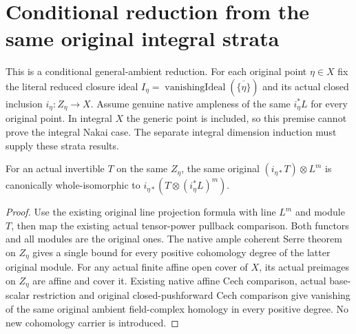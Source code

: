 \section{Conditional reduction from the same original integral strata}
This is a conditional general-ambient reduction. For each original point
$\eta\in X$ fix the literal reduced closure ideal
$I_\eta=\operatorname{vanishingIdeal}(\overline{\{\eta\}})$ and its actual
closed inclusion $i_\eta:Z_\eta\to X$. Assume genuine native ampleness of
the same $i_\eta^*L$ for every original point. In integral $X$ the generic
point is included, so this premise cannot prove the integral Nakai case.
The separate integral dimension induction must supply these strata results.

\begin{lemma}
\label{lem:seshadri-original-prime-piece-twist}
For an actual invertible $T$ on the same $Z_\eta$, the same original
$(i_{\eta*}T)\otimes L^m$ is canonically whole-isomorphic to
$i_{\eta*}(T\otimes(i_\eta^*L)^m)$.
\end{lemma}
\begin{proof}
Use the existing original line projection formula with line $L^m$ and
module $T$, then map the existing actual tensor-power
pullback comparison. Both functors and all modules are the original ones.
The native ample coherent Serre theorem on $Z_\eta$ gives a single bound
for every positive cohomology degree of the latter original module.
For any actual finite affine open cover of $X$, its actual preimages on
$Z_\eta$ are affine and cover it. Existing native affine Cech comparison,
actual base-scalar restriction and original closed-pushforward Cech
comparison give vanishing of the same original ambient field-complex
homology in every positive degree. No new cohomology carrier is introduced.
\end{proof}

